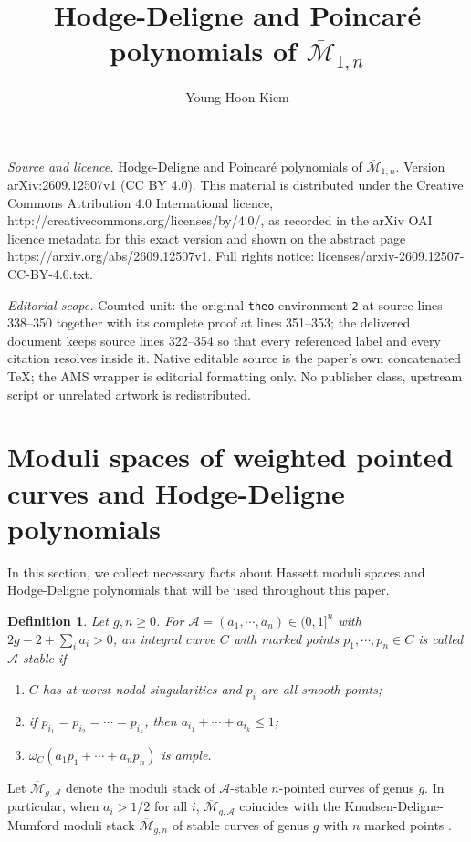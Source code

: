 \documentclass[10pt,a4paper]{amsart}
\numberwithin{equation}{section}
\newtheorem{defi}[theo]{Definition}
\def\cA{{\mathcal A}}
\def\cM{{\mathcal M}}
\def\bcM{\overline{\cM}}
\begin{document}
\title[Hodge-Deligne and Poincar'e polynomials of overlinemathcal M]{Hodge-Deligne and Poincar\'e polynomials of $\overline{\mathcal M}_{1,n}$}
\author{Young-Hoon Kiem}
\date{}
\maketitle
\noindent\emph{Source and licence.} Hodge-Deligne and Poincar\'e polynomials of $\overline{\mathcal M}_{1,n}$. Version arXiv:2609.12507v1 (CC BY 4.0). This material is distributed under the Creative Commons Attribution 4.0 International licence, http://creativecommons.org/licenses/by/4.0/, as recorded in the arXiv OAI licence metadata for this exact version and shown on the abstract page https://arxiv.org/abs/2609.12507v1. Full rights notice: licenses/arxiv-2609.12507-CC-BY-4.0.txt.\par\smallskip
\noindent\textit{Editorial scope.} Counted unit: the original \texttt{theo} environment \texttt{2} at source lines 338--350 together with its complete proof at lines 351--353; the delivered document keeps source lines 322--354 so that every referenced label and every citation resolves inside it. Native editable source is the paper's own concatenated TeX; the AMS wrapper is editorial formatting only. No publisher class, upstream script or unrelated artwork is redistributed.
\section{Moduli spaces of weighted pointed curves and Hodge-Deligne polynomials}
In this section, we collect necessary facts about Hassett moduli spaces \cite{Hst} and Hodge-Deligne polynomials that will be used throughout this paper. 

\begin{defi} \cite{Hst}
Let $g, n\ge 0$. For $\cA=(a_1,\cdots,a_n)\in (0,1]^n$ with $2g-2+\sum_i a_i>0$, an integral curve $C$ with marked points $p_1, \cdots,p_n\in C$ is called $\cA$-\emph{stable} if \begin{enumerate}
\item $C$ has at worst nodal singularities and $p_i$ are all smooth points;
\item if $p_{i_1}=p_{i_2}=\cdots=p_{i_k}$, then $a_{i_1}+\cdots+a_{i_k}\le 1$;
\item $\omega_C(a_1p_1+\cdots +a_np_n)$ is ample. 
\end{enumerate}
\end{defi}
Let $\bcM_{g,\cA}$ denote the moduli stack of $\cA$-stable $n$-pointed curves of genus $g$. 
In particular, when $a_i>1/2$ for all $i$, $\bcM_{g,\cA}$ coincides with the Knudsen-Deligne-Mumford moduli stack $\bcM_{g,n}$ of stable curves of genus $g$ with $n$ marked points \cite{DM,Knu}.
\end{document}
